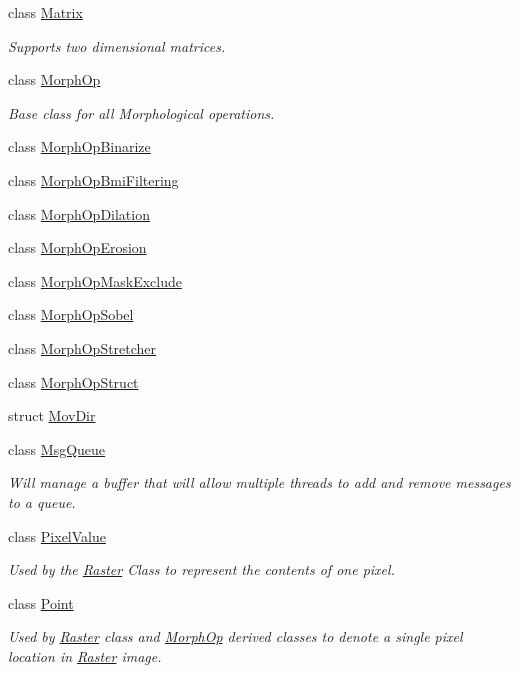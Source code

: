 \begin{DoxyCompactItemize}
class \hyperlink{class_k_k_b_1_1_matrix}{Matrix}
\begin{DoxyCompactList}\small\item\em Supports two dimensional matrices. \end{DoxyCompactList}\item 
class \hyperlink{class_k_k_b_1_1_morph_op}{Morph\+Op}
\begin{DoxyCompactList}\small\item\em Base class for all Morphological operations. \end{DoxyCompactList}\item 
class \hyperlink{class_k_k_b_1_1_morph_op_binarize}{Morph\+Op\+Binarize}
\item 
class \hyperlink{class_k_k_b_1_1_morph_op_bmi_filtering}{Morph\+Op\+Bmi\+Filtering}
\item 
class \hyperlink{class_k_k_b_1_1_morph_op_dilation}{Morph\+Op\+Dilation}
\item 
class \hyperlink{class_k_k_b_1_1_morph_op_erosion}{Morph\+Op\+Erosion}
\item 
class \hyperlink{class_k_k_b_1_1_morph_op_mask_exclude}{Morph\+Op\+Mask\+Exclude}
\item 
class \hyperlink{class_k_k_b_1_1_morph_op_sobel}{Morph\+Op\+Sobel}
\item 
class \hyperlink{class_k_k_b_1_1_morph_op_stretcher}{Morph\+Op\+Stretcher}
\item 
class \hyperlink{class_k_k_b_1_1_morph_op_struct}{Morph\+Op\+Struct}
\item 
struct \hyperlink{struct_k_k_b_1_1_mov_dir}{Mov\+Dir}
\item 
class \hyperlink{class_k_k_b_1_1_msg_queue}{Msg\+Queue}
\begin{DoxyCompactList}\small\item\em Will manage a buffer that will allow multiple threads to add and remove messages to a queue. \end{DoxyCompactList}\item 
class \hyperlink{class_k_k_b_1_1_pixel_value}{Pixel\+Value}
\begin{DoxyCompactList}\small\item\em Used by the \hyperlink{class_k_k_b_1_1_raster}{Raster} Class to represent the contents of one pixel. \end{DoxyCompactList}\item 
class \hyperlink{class_k_k_b_1_1_point}{Point}
\begin{DoxyCompactList}\small\item\em Used by \hyperlink{class_k_k_b_1_1_raster}{Raster} class and \hyperlink{class_k_k_b_1_1_morph_op}{Morph\+Op} derived classes to denote a single pixel location in \hyperlink{class_k_k_b_1_1_raster}{Raster} image. \end{DoxyCompactList}\item 

\end{DoxyCompactItemize}
